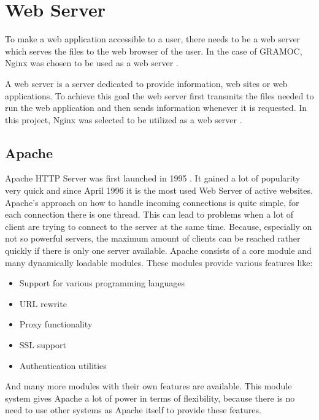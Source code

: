 \chapter{Web Server}
\label{sec:webserver}

\author{Nico Leidenfrost}
%
To make a web application accessible to a user, there needs to be a web server which serves the files to the web browser of the user. In the case of GRAMOC, Nginx was chosen to be used as a web server \autocite{nginx}.

A web server is a server dedicated to provide information, web sites or web applications. To achieve this goal the web server first transmits the files needed to run the web application and then sends information whenever it is requested. In this project, Nginx was selected to be utilized as a web server \autocite{nginx}.

\section{Apache}
Apache HTTP Server was first launched in 1995 \autocite{apache}. It gained a lot of popularity very quick and since April 1996 it is the most used Web Server of active websites. Apache's approach on how to handle incoming connections is quite simple, for each connection there is one thread. This can lead to problems when a lot of client are trying to connect to the server at the same time. Because, especially on not so powerful servers, the maximum amount of clients can be reached rather quickly if there is only one server available. Apache consists of a core module and many dynamically loadable modules. These modules provide various features like:

\begin{itemize}
    \item Support for various programming languages
    \item URL rewrite
    \item Proxy functionality
    \item SSL support
    \item Authentication utilities
\end{itemize}

And many more modules with their own features are available. This module system gives Apache a lot of power in terms of flexibility, because there is no need to use other systems as Apache itself to provide these features.

